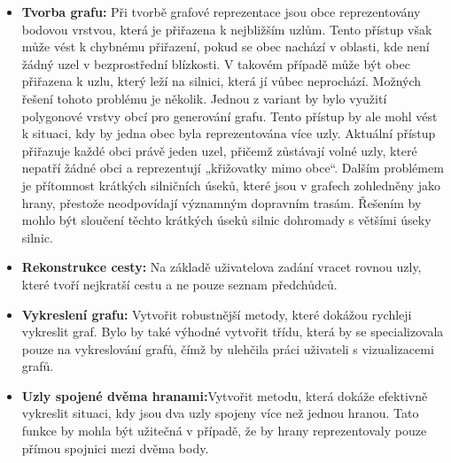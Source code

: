 \begin{itemize} 
    \item \textbf{Tvorba grafu:} Při tvorbě grafové reprezentace jsou obce reprezentovány bodovou vrstvou, která je přiřazena k nejbližším uzlům. Tento přístup však může vést k chybnému přiřazení, pokud se obec nachází v oblasti, kde není žádný uzel v bezprostřední blízkosti. V takovém případě může být obec přiřazena k uzlu, který leží na silnici, která jí vůbec neprochází. Možných řešení tohoto problému je několik. Jednou z variant by bylo využití polygonové vrstvy obcí pro generování grafu. Tento přístup by ale mohl vést k situaci, kdy by jedna obec byla reprezentována více uzly. Aktuální přístup přiřazuje každé obci právě jeden uzel, přičemž zůstávají volné uzly, které nepatří žádné obci a reprezentují „křižovatky mimo obce“. Dalším problémem je přítomnost krátkých silničních úseků, které jsou v grafech zohledněny jako hrany, přestože neodpovídají významným dopravním trasám. Řešením by mohlo být sloučení těchto krátkých úseků silnic dohromady s většími úseky silnic.

    \item \textbf{Rekonstrukce cesty:} Na základě uživatelova zadání vracet rovnou uzly, které tvoří nejkratší cestu a ne pouze seznam předchůdců.
    
    \item \textbf{Vykreslení grafu:} Vytvořit robustnější metody, které dokážou rychleji vykreslit graf. Bylo by také výhodné vytvořit třídu, která by se specializovala pouze na vykreslování grafů, čímž by ulehčila práci uživateli s vizualizacemi grafů.

    \item \textbf{Uzly spojené dvěma hranami:}Vytvořit metodu, která dokáže efektivně vykreslit situaci, kdy jsou dva uzly spojeny více než jednou hranou. Tato funkce by mohla být užitečná v případě, že by hrany reprezentovaly pouze přímou spojnici mezi dvěma body.
    

\end{itemize}

